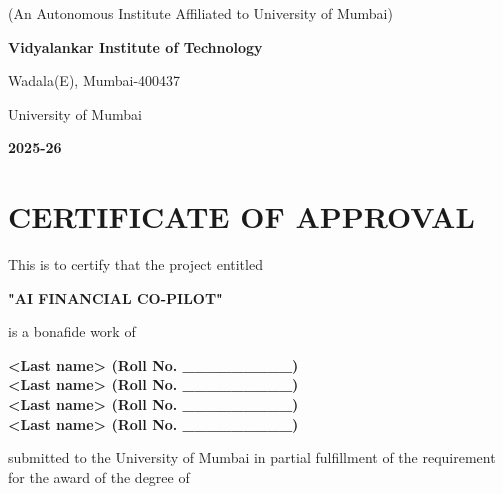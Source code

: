 \documentclass[11pt,a4paper]{report}
\begin{document}
\begin{titlepage}
    \vspace{1cm}
    
    {\large (An Autonomous Institute Affiliated to University of Mumbai)\par}
    {\large\bfseries Vidyalankar Institute of Technology\par}
    {\large Wadala(E), Mumbai-400437\par}
    {\large University of Mumbai\par}
    
    \vspace{0.5cm}
    
    {\large\bfseries 2025-26\par}
\end{titlepage}

\chapter*{CERTIFICATE OF APPROVAL}
\thispagestyle{empty}

\vspace{1cm}

This is to certify that the project entitled

\vspace{0.5cm}

\begin{center}
    {\Large\bfseries "AI FINANCIAL CO-PILOT"}
\end{center}

\vspace{0.5cm}

is a bonafide work of

\vspace{0.3cm}

\begin{center}
    {\bfseries <First name> <Last name> (Roll No. \_\_\_\_\_\_\_\_\_)}\\
    {\bfseries <First name> <Last name> (Roll No. \_\_\_\_\_\_\_\_\_)}\\
    {\bfseries <First name> <Last name> (Roll No. \_\_\_\_\_\_\_\_\_)}\\
    {\bfseries <First name> <Last name> (Roll No. \_\_\_\_\_\_\_\_\_)}
\end{center}

\vspace{0.5cm}

submitted to the University of Mumbai in partial fulfillment of the requirement for the award of the degree of
\end{document}
